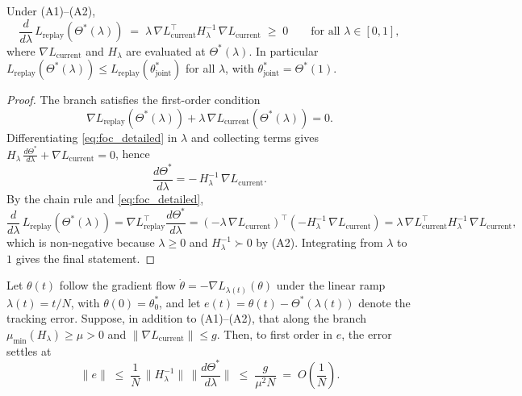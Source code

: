 \begin{proposition}
    \label{prop:monotone}
    Under (A1)--(A2),
    \begin{equation*}
        \frac{d}{d\lambda}\, L_{\text{replay}}(\Theta^*(\lambda))
        \;=\; \lambda\, \nabla L_{\text{current}}^\top H_\lambda^{-1}\, \nabla L_{\text{current}}
        \;\ge\; 0
        \qquad \text{for all } \lambda \in [0,1],
    \end{equation*}
    where $\nabla L_{\text{current}}$ and $H_\lambda$ are evaluated at $\Theta^*(\lambda)$. In particular $L_{\text{replay}}(\Theta^*(\lambda)) \le L_{\text{replay}}(\theta_{\text{joint}}^*)$ for all $\lambda$, with $\theta_{\text{joint}}^* = \Theta^*(1)$.
\end{proposition}

\begin{proof}
    The branch satisfies the first-order condition
    \begin{equation}
        \nabla L_{\text{replay}}(\Theta^*(\lambda)) + \lambda\, \nabla L_{\text{current}}(\Theta^*(\lambda)) = 0.
        \label{eq:foc_detailed}
    \end{equation}
    Differentiating \eqref{eq:foc_detailed} in $\lambda$ and collecting terms gives $H_\lambda\, \tfrac{d\Theta^*}{d\lambda} + \nabla L_{\text{current}} = 0$, hence
    \begin{equation}
        \frac{d\Theta^*}{d\lambda} = -\,H_\lambda^{-1}\, \nabla L_{\text{current}}.
        \label{eq:path_movement}
    \end{equation}
    By the chain rule and \eqref{eq:foc_detailed},
    \begin{equation*}
        \frac{d}{d\lambda}\, L_{\text{replay}}(\Theta^*(\lambda))
        = \nabla L_{\text{replay}}^\top \frac{d\Theta^*}{d\lambda}
        = \left(-\lambda\, \nabla L_{\text{current}}\right)^\top \left(-H_\lambda^{-1}\, \nabla L_{\text{current}}\right)
        = \lambda\, \nabla L_{\text{current}}^\top H_\lambda^{-1}\, \nabla L_{\text{current}},
    \end{equation*}
    which is non-negative because $\lambda \ge 0$ and $H_\lambda^{-1} \succ 0$ by (A2). Integrating from $\lambda$ to $1$ gives the final statement.
\end{proof}

\begin{proposition}
    \label{prop:tracking}
    Let $\theta(t)$ follow the gradient flow $\dot\theta = -\nabla L_{\lambda(t)}(\theta)$ under the linear ramp $\lambda(t) = t/N$, with $\theta(0) = \theta_0^*$, and let $e(t) = \theta(t) - \Theta^*(\lambda(t))$ denote the tracking error. Suppose, in addition to (A1)--(A2), that along the branch $\mu_{\min}(H_\lambda) \ge \mu > 0$ and $\|\nabla L_{\text{current}}\| \le g$. Then, to first order in $e$, the error settles at
    \begin{equation*}
        \|e\| \;\le\; \frac{1}{N}\, \big\|H_\lambda^{-1}\big\|\, \Big\|\frac{d\Theta^*}{d\lambda}\Big\|
        \;\le\; \frac{g}{\mu^2 N}
        \;=\; O\!\left(\frac{1}{N}\right).
    \end{equation*}
\end{proposition}

